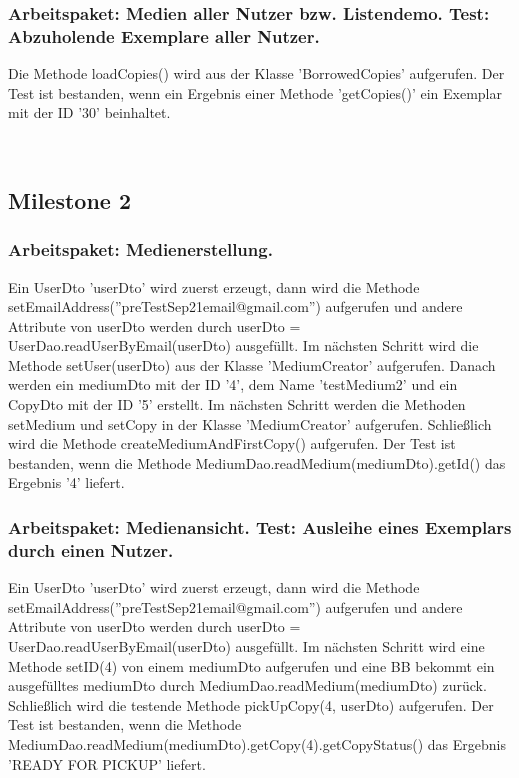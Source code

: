 \documentclass{article}
\begin{document}
\subsubsection{Arbeitspaket: Medien aller Nutzer bzw. Listendemo. Test: Abzuholende Exemplare aller Nutzer.}
Die Methode loadCopies() wird aus der Klasse 'BorrowedCopies' aufgerufen. Der Test ist bestanden, wenn ein Ergebnis einer Methode 'getCopies()' ein Exemplar mit der ID '30' beinhaltet.

­\subsection{Milestone 2}
\subsubsection{Arbeitspaket: Medienerstellung.}
Ein UserDto 'userDto' wird zuerst erzeugt, dann wird die Methode \linebreak setEmailAddress(''preTestSep21email@gmail.com'') aufgerufen und andere Attribute von userDto werden durch userDto = UserDao.readUserByEmail(userDto) ausgefüllt. Im nächsten Schritt wird die Methode setUser(userDto) aus der Klasse 'MediumCreator' aufgerufen. Danach werden ein mediumDto mit der ID '4', dem Name 'testMedium2' und ein CopyDto mit der ID '5' erstellt. Im nächsten Schritt werden die Methoden setMedium und setCopy in der Klasse 'MediumCreator' aufgerufen. Schließlich wird die Methode createMediumAndFirstCopy() aufgerufen. Der Test ist bestanden, wenn die Methode MediumDao.readMedium(mediumDto).getId() das Ergebnis '4' liefert.

\subsubsection{Arbeitspaket: Medienansicht. Test: Ausleihe eines Exemplars durch einen Nutzer.}
Ein UserDto 'userDto' wird zuerst erzeugt, dann wird die Methode \linebreak setEmailAddress(''preTestSep21email@gmail.com'') aufgerufen und andere Attribute von userDto werden durch userDto = UserDao.readUserByEmail(userDto) ausgefüllt. Im nächsten Schritt wird eine Methode setID(4) von einem mediumDto aufgerufen und eine BB bekommt ein ausgefülltes mediumDto durch MediumDao.readMedium(mediumDto) zurück. Schließlich wird die testende Methode pickUpCopy(4, userDto) aufgerufen. Der Test ist bestanden, wenn die Methode MediumDao.readMedium(mediumDto).getCopy(4).getCopyStatus() das Ergebnis 'READY FOR PICKUP' liefert.
\end{document}
